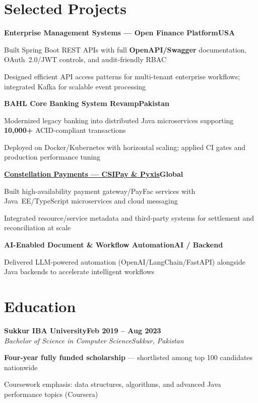 \documentclass[letterpaper,10pt]{article}
\newcommand{\heading}[2]{
  \hspace{8pt}#1\hfill#2\\
}
\newcommand{\headingBf}[2]{
  \heading{\textbf{#1}}{\textbf{#2}}
}
\newcommand{\headingIt}[2]{
  \heading{\textit{#1}}{\textit{#2}}
}
\newenvironment{resume_list}{
  \vspace{-6pt}
  \begin{itemize}[itemsep=-1px, parsep=0.5pt, topsep=1pt, leftmargin=22pt]
}{
  \end{itemize}
  \vspace{-2pt}
}
\begin{document}
\section{Selected Projects}

\headingBf{Enterprise Management Systems --- Open Finance Platform}{USA}
\begin{resume_list}
  \item Built Spring Boot REST APIs with full \textbf{OpenAPI/Swagger} documentation, OAuth~2.0/JWT controls, and audit-friendly RBAC
  \item Designed efficient API access patterns for multi-tenant enterprise workflows; integrated Kafka for scalable event processing
\end{resume_list}

\vspace{2pt}
\headingBf{BAHL Core Banking System Revamp}{Pakistan}
\begin{resume_list}
  \item Modernized legacy banking into distributed Java microservices supporting \textbf{10,000+} ACID-compliant transactions
  \item Deployed on Docker/Kubernetes with horizontal scaling; applied CI gates and production performance tuning
\end{resume_list}

\vspace{2pt}
\headingBf{\href{https://www.constellationpayments.com/}{Constellation Payments --- CSIPay \& Pyxis}}{Global}
\begin{resume_list}
  \item Built high-availability payment gateway/PayFac services with Java~EE/TypeScript microservices and cloud messaging
  \item Integrated resource/service metadata and third-party systems for settlement and reconciliation at scale
\end{resume_list}

\vspace{2pt}
\headingBf{AI-Enabled Document \& Workflow Automation}{AI / Backend}
\begin{resume_list}
  \item Delivered LLM-powered automation (OpenAI/LangChain/FastAPI) alongside Java backends to accelerate intelligent workflows
\end{resume_list}

\section{Education}
\headingBf{Sukkur IBA University}{Feb 2019 -- Aug 2023}
\headingIt{Bachelor of Science in Computer Science}{Sukkur, Pakistan}
\begin{resume_list}
  \item \textbf{Four-year fully funded scholarship} --- shortlisted among top 100 candidates nationwide
  \item Coursework emphasis: data structures, algorithms, and advanced Java performance topics (Coursera)
\end{resume_list}
\end{document}
